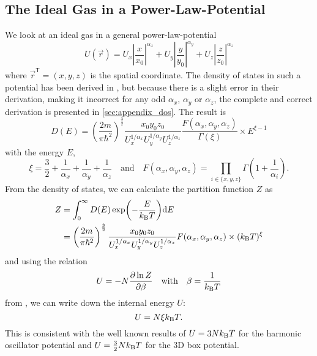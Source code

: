 \subsection{The Ideal Gas in a Power-Law-Potential}
We look at an ideal gas in a general power-law-potential
%
\begin{equation*}
    U(\vec{r}) = U_x \left| \frac{x}{x_0} \right|^{\alpha_x} + U_y \left| \frac{y}{y_0} \right|^{\alpha_y} + U_z \left| \frac{z}{z_0} \right|^{\alpha_z}
\end{equation*}
where $\vec{r}^\mathsf{T} = (x,y,z)$ is the spatial coordinate.
%
The density of states in such a potential has been derived in \cite{PhysRevA.35.4354}, but because there is a slight error in their derivation, making it incorrect for any odd $\alpha_x$, $\alpha_y$ or $\alpha_z$, the complete and correct derivation is presented in \cref{sec:appendix_dos}. The result is
%
\begin{equation*} %
    D(E) = \left(\frac{2m}{\pi\hbar^2}\right)^\frac{3}{2} \frac{x_0 y_0 z_0}{U_x^{1/\alpha_x} U_y^{1/\alpha_y} U_z^{1/\alpha_z}} \frac{F(\alpha_x,\alpha_y,\alpha_z)}{\Gamma(\xi)} \times E^{\xi - 1}
\end{equation*}
with the energy $E$,
\begin{equation*}
    \xi = \frac{3}{2} + \frac{1}{\alpha_x} + \frac{1}{\alpha_y} + \frac{1}{\alpha_z} \quad \text{and} \quad F(\alpha_x, \alpha_y, \alpha_z) = \prod_{i \in \{x,y,z\}} \Gamma\!\left(1 + \frac{1}{\alpha_i}\right).
\end{equation*}
%
From the density of states, we can calculate the partition function $Z$ as
\begin{align*}
    Z &= \int_0^\infty D(E)\exp{\!\left(-\frac{E}{\ensuremath{k_\text{B}}T}\right)} \text{d}E \nonumber \\
      &= \left(\frac{2m}{\pi\hbar^2}\right)^\frac{3}{2} \frac{x_0 y_0 z_0}{U_x^{1/\alpha_x} U_y^{1/\alpha_y} U_z^{1/\alpha_z}} F(\alpha_x, \alpha_y, \alpha_z) \times (k_\text{B} T)^\xi
\end{align*}
and using the relation
\begin{equation}
    U = -N \frac{\partial \ln Z}{\partial \beta} \quad \text{with} \quad \beta = \frac{1}{k_\text{B} T} \nonumber
\end{equation}
from \cite{laurendeau_2005}, we can write down the internal energy $U$:
\begin{equation*}
    U = N \xi k_\text{B} T.
\end{equation*}
This is consistent with the well known results of $U = 3Nk_\text{B} T$ for the harmonic oscillator potential and $U = \frac{3}{2} N k_\text{B} T$ for the 3D box potential.

